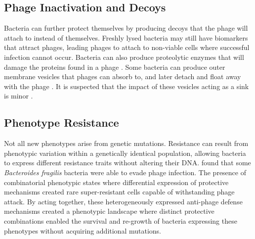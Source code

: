\subsection{Phage Inactivation and Decoys}
Bacteria can further protect themselves by producing decoys that the phage will attach to instead of themselves. 
Freshly lysed bacteria may still have biomarkers that attract phages, leading phages to attach to non-viable cells where successful infection cannot occur.
Bacteria can also produce proteolytic enzymes that will damage the proteins found in a phage \cite{tanQuorumSensingDetermines2015}. 
Some bacteria can produce outer membrane vesicles that phages can absorb to, and later detach and float away with the phage \cite{rabinovitchBacterialDebrisEcological2003}. 
It is suspected that the impact of these vesicles acting as a sink is minor \cite{bullPhageBacterialDynamicsSpatial2018}. 


\subsection{Phenotype Resistance}
Not all new phenotypes arise from genetic mutations. 
Resistance can result from phenotypic variation within a genetically identical population, allowing bacteria to express different resistance traits without altering their DNA.
\citet{guptaCombinatorialPhenotypicLandscape2025} found that some \textit{Bacteroides fragilis} bacteria were able to evade phage infection.  
The presence of combinatorial phenotypic states where differential expression of protective mechanisms created rare super-resistant cells capable of withstanding phage attack.
By acting together, these heterogeneously expressed anti-phage defense mechanisms created a phenotypic landscape where distinct protective combinations enabled the survival and re-growth of bacteria expressing these phenotypes without acquiring additional mutations. 

